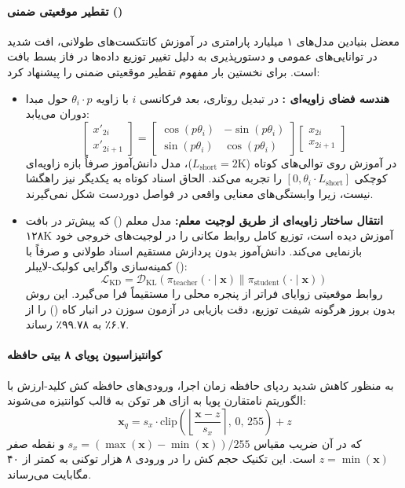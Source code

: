 \paragraph*{تقطیر موقعیتی ضمنی ()}
معضل بنیادین مدل‌های ۱ میلیارد پارامتری در آموزش کانتکست‌های طولانی، افت شدید در توانایی‌های عمومی و دستورپذیری به دلیل تغییر توزیع داده‌ها در فاز بسط بافت است.  برای نخستین بار مفهوم تقطیر موقعیتی ضمنی را پیشنهاد کرد:
\begin{itemize}
    \item \textbf{هندسه فضای زاویه‌ای :} در تبدیل روتاری، بعد فرکانسی $i$ با زاویه $\theta_i \cdot p$ حول مبدا دوران می‌یابد:
    \begin{equation}
        \begin{bmatrix} x'_{2i} \\ x'_{2i+1} \end{bmatrix} = \begin{bmatrix} \cos(p\theta_i) & -\sin(p\theta_i) \\ \sin(p\theta_i) & \cos(p\theta_i) \end{bmatrix} \begin{bmatrix} x_{2i} \\ x_{2i+1} \end{bmatrix}
    \end{equation}
    در آموزش روی توالی‌های کوتاه ($L_{\text{short}} = 2\text{K}$)، مدل دانش‌آموز صرفاً بازه زاویه‌ای کوچکی $[0, \theta_i \cdot L_{\text{short}}]$ را تجربه می‌کند. الحاق اسناد کوتاه به یکدیگر نیز راهگشا نیست، زیرا وابستگی‌های معنایی واقعی در فواصل دوردست شکل نمی‌گیرند.
    \item \textbf{انتقال ساختار زاویه‌ای از طریق لوجیت معلم:} مدل معلم () که پیش‌تر در بافت ۱۲۸K آموزش دیده است، توزیع کامل روابط مکانی را در لوجیت‌های خروجی خود بازنمایی می‌کند. دانش‌آموز بدون پردازش مستقیم اسناد طولانی و صرفاً با کمینه‌سازی واگرایی کولبک-لایبلر ():
    \begin{equation}
        \mathcal{L}_{\text{KD}} = \mathcal{D}_{\text{KL}}\left( \pi_{\text{teacher}}(\cdot \mid \mathbf{x}) \parallel \pi_{\text{student}}(\cdot \mid \mathbf{x}) \right)
    \end{equation}
    روابط موقعیتی زوایای فراتر از پنجره محلی را مستقیماً فرا می‌گیرد. این روش بدون بروز هرگونه شیفت توزیع، دقت بازیابی در آزمون سوزن در انبار کاه () را از ۶.۷٪ به ۹۹.۷۸٪ رساند.
\end{itemize}

\paragraph*{کوانتیزاسیون پویای ۸ بیتی حافظه }
به منظور کاهش شدید ردپای حافظه زمان اجرا، ورودی‌های حافظه کش کلید-ارزش با الگوریتم نامتقارن پویا به ازای هر توکن به قالب  کوانتیزه می‌شوند:
\begin{equation}
    \mathbf{x}_q = s_x \cdot \text{clip}\left( \left\lfloor \frac{\mathbf{x} - z}{s_x} \right\rceil, \, 0, \, 255 \right) + z
\end{equation}
که در آن ضریب مقیاس $s_x = (\max(\mathbf{x}) - \min(\mathbf{x})) / 255$ و نقطه صفر $z = \min(\mathbf{x})$ است. این تکنیک حجم کش را در ورودی ۸ هزار توکنی به کمتر از ۴۰ مگابایت می‌رساند.